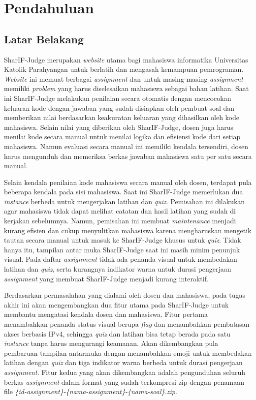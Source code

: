 \chapter{Pendahuluan}
\label{chap:intro}
   
\section{Latar Belakang}
\label{sec:label}

SharIF-Judge merupakan \textit{website} utama bagi mahasiswa informatika Universitas Katolik Parahyangan untuk berlatih dan mengasah kemampuan pemrograman. \textit{Website} ini memuat berbagai \textit{assignment} dan untuk masing-masing \textit{assignment} memiliki \textit{problem} yang harus diselesaikan mahasiswa sebagai bahan latihan. Saat ini SharIF-Judge melakukan penilaian secara otomatis dengan mencocokan keluaran kode dengan jawaban yang sudah disiapkan oleh pembuat soal dan memberikan nilai berdasarkan keakuratan keluaran yang dihasilkan oleh kode mahasiswa. Selain nilai yang diberikan oleh SharIF-Judge, dosen juga harus menilai kode secara manual untuk menilai logika dan efisiensi kode dari setiap mahasiswa. Namun evaluasi secara manual ini memiliki kendala tersendiri, dosen harus mengunduh dan memeriksa berkas jawaban mahasiswa satu per satu secara manual. 

Selain kendala penilaian kode mahasiswa secara manual oleh dosen, terdapat pula beberapa kendala pada sisi mahasiswa. Saat ini SharIF-Judge memerlukan dua \textit{instance} berbeda untuk mengerjakan latihan dan \textit{quiz}. Pemisahan ini  dilakukan agar mahasiswa tidak dapat melihat catatan dan hasil latihan yang sudah di kerjakan sebelumnya. Namun, pemisahan ini membuat \textit{maintenance} menjadi kurang efisien dan cukup menyulitkan mahasiswa karena mengharuskan mengetik tautan secara manual untuk masuk ke SharIF-Judge khusus untuk \textit{quiz}. Tidak hanya itu, tampilan antar muka SharIF-Judge saat ini masih minim penunjuk visual. Pada daftar \textit{assignment} tidak ada penanda visual untuk membedakan latihan dan \textit{quiz}, serta kurangnya indikator warna untuk durasi pengerjaan \textit{assignment} yang membuat SharIF-Judge menjadi kurang interaktif. 

Berdasarkan permasalahan yang dialami oleh dosen dan mahasiswa, pada tugas akhir ini akan mengembangkan dua fitur utama pada SharIF-Judge untuk membantu mengatasi kendala dosen dan mahasiswa. Fitur pertama menambahkan penanda status visual berupa \textit{flag} dan menambahkan pembatasan akses berbasis IPv4, sehingga \textit{quiz} dan latihan bisa tetap berada pada satu \textit{instance} tanpa harus mengurangi keamanan. Akan dikembangkan pula pembaruan tampilan antarmuka dengan menambahkan emoji untuk membedakan latihan dengan \textit{quiz} dan tiga indikator warna berbeda untuk durasi pengerjaan \textit{assignment}. Fitur kedua yang akan dikembangkan adalah pengunduhan seluruh berkas \textit{assignment} dalam format yang sudah terkompresi zip dengan penamaan file \textit{\{id-assignment\}-\{nama-assignment\}-\{nama-soal\}.zip}.

